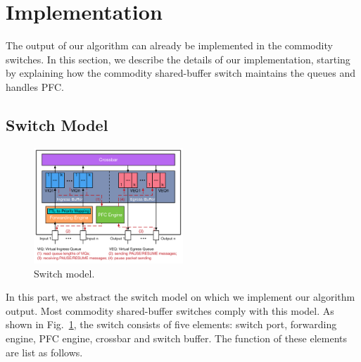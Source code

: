 \section{Implementation}\label{sec:implementation}

The output of our algorithm can already be implemented in the commodity switches. In this section, we
describe the details of our implementation, starting by explaining how the commodity shared-buffer switch
maintains the queues and handles PFC.   

\subsection{Switch Model}\label{subsec:model}

\begin{figure}
	\centering
		\includegraphics[width=0.5\textwidth] {figs/switch_model}
	\caption{Switch model.}\label{fig:switchmodel}

\end{figure}

In this part, we abstract the switch model on which we implement our algorithm output. 
Most commodity shared-buffer switches comply with this model. 
As shown in Fig.~\ref{fig:switchmodel},
the switch consists of five elements: switch port, forwarding engine, PFC engine, crossbar and switch buffer. The function of these elements are list as follows.


